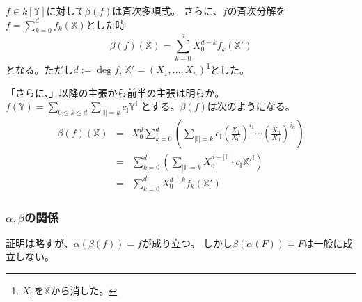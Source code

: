 \documentclass[a4]{article}
\begin{document}
        \begin{Prop}
            $f \in k[\mathbb{Y}]$に対して$\beta (f)$は斉次多項式。
            さらに、$f$の斉次分解を$f=\sum^{d}_{k=0}{f_k(\mathbb{X})}$とした時
            \[ \beta(f)(\mathbb{X})=\sum^{d}_{k=0}{X_0^{d-k} f_k(\mathbb{X}')}\]
            となる。ただし$d:=\deg f$, $\mathbb{X}'=(X_1, \dots, X_n)$\footnote{$X_0$を$\mathbb{X}$から消した。}とした。
        \end{Prop}
        \begin{Proof}
            「さらに、」以降の主張から前半の主張は明らか。
            $f(\mathbb{Y})=\sum_{0 \leq k \leq d}{ \sum_{|\mathbb{I}|=k}{c_\mathbb{I} \mathbb{Y}^{\mathbb{I}}} }$
            とする。$\beta(f)$は次のようになる。
            \begin{eqnarray*}
                \beta(f)(\mathbb{X})
                &=& X_0^d \sum^{d}_{k=0}{
                    \left( \sum_{|\mathbb{I}|=k}{c_\mathbb{I}
                    \left(\frac{X_1}{X_0}\right)^{i_1} \cdots \left(\frac{X_n}{X_0}\right)^{i_n}} \right)} \\
                &=& \sum^{d}_{k=0}{
                    \left( \sum_{|\mathbb{I}|=k}{X_0^{d-|\mathbb{I}|} \cdot c_\mathbb{I} {\mathbb{X}'}^{\mathbb{I}}} \right)} \\
                &=& \sum^{d}_{k=0}{X_0^{d-k} f_k(\mathbb{X}')}
            \end{eqnarray*}
            \QED
        \end{Proof}

        \subsubsection{$\alpha, \beta$の関係}
        証明は略すが、$\alpha(\beta(f))=f$が成り立つ。
        しかし$\beta(\alpha(F))=F$は一般に成立しない。
\end{document}
